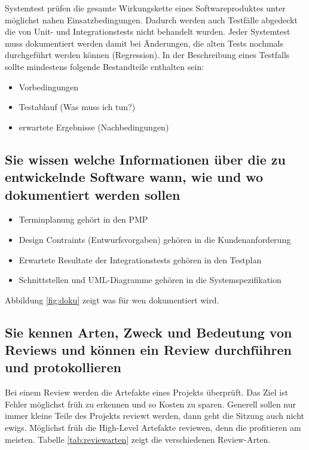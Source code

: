 Systemtest prüfen die gesamte Wirkungskette eines Softwareproduktes unter möglichst nahen Einsatzbedingungen. Dadurch werden auch Testfälle abgedeckt die von Unit- und Integrationstests nicht behandelt wurden. Jeder Systemtest muss dokumentiert werden damit bei Änderungen, die alten Tests nochmals durchgeführt werden können (Regression). In der Beschreibung eines Testfalls sollte mindestens folgende Bestandteile enthalten sein:

\begin{itemize}
	\item Vorbedingungen
	\item Testablauf (Was muss ich tun?)
	\item erwartete Ergebnisse (Nachbedingungen)
\end{itemize}

\subsection{Sie wissen welche Informationen über die zu entwickelnde Software wann, wie und wo dokumentiert werden sollen}

\begin{itemize}
	\item Terminplanung gehört in den \ac{PMP}
	\item Design Contraints (Entwurfsvorgaben) gehören in die Kundenanforderung
	\item Erwartete Resultate der Integrationstests gehören in den Testplan
	\item Schnittstellen und UML-Diagramme gehören in die Systemspezifikation
\end{itemize}
Abbildung \ref{fig:doku} zeigt was für wen dokumentiert wird.


\newpage

\subsection{Sie kennen Arten, Zweck und Bedeutung von Reviews und können ein Review durchführen und protokollieren}

Bei einem Review werden die Artefakte eines Projekts überprüft. Das Ziel ist Fehler möglichst früh zu erkennen und so Kosten zu sparen. Generell sollen nur immer kleine Teile des Projekts reviewt werden, dann geht die Sitzung auch nicht ewigs. Möglichst früh die High-Level Artefakte reviewen, denn die profitieren am meisten. Tabelle \ref{tab:reviewarten} zeigt die verschiedenen Review-Arten. 

